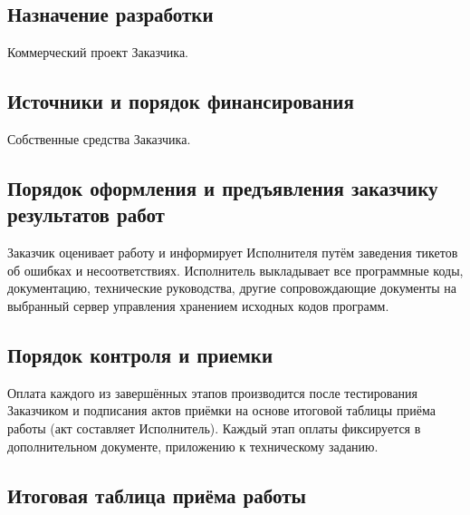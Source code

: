 \documentclass[10pt,a4paper]{article}
\begin{document}
\subsection{Назначение разработки}

Коммерческий проект Заказчика.

\subsection{Источники и порядок финансирования}

Собственные средства Заказчика.

\subsection{Порядок оформления и предъявления заказчику результатов работ}

Заказчик оценивает работу и информирует Исполнителя путём заведения тикетов об
ошибках и несоответствиях. Исполнитель выкладывает все программные коды,
документацию, технические руководства, другие сопровождающие документы на
выбранный сервер управления хранением исходных кодов программ.

\subsection{Порядок контроля и приемки}

Оплата каждого из завершённых этапов производится после тестирования Заказчиком
и подписания актов приёмки на основе итоговой таблицы приёма работы (акт
составляет Исполнитель). Каждый этап оплаты фиксируется в дополнительном
документе, приложению к техническому заданию.

\subsection{Итоговая таблица приёма работы}
\end{document}
